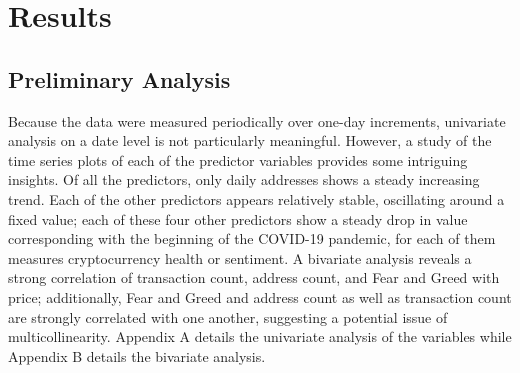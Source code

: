 \documentclass{article}
\begin{document}
\section{Results}
\subsection{Preliminary Analysis}
Because the data were measured periodically over one-day increments, univariate analysis on a date level is not particularly meaningful. However, a study of the time series plots of each of the predictor variables provides some intriguing insights. Of all the predictors, only daily addresses shows a steady increasing trend. Each of the other predictors appears relatively stable, oscillating around a fixed value; each of these four other predictors show a steady drop in value corresponding with the beginning of the COVID-19 pandemic, for each of them measures cryptocurrency health or sentiment. A bivariate analysis reveals a strong correlation of transaction count, address count, and Fear and Greed with price; additionally, Fear and Greed and address count as well as transaction count are strongly correlated with one another, suggesting a potential issue of multicollinearity. Appendix A details the univariate analysis of the variables while Appendix B details the bivariate analysis.
\end{document}
